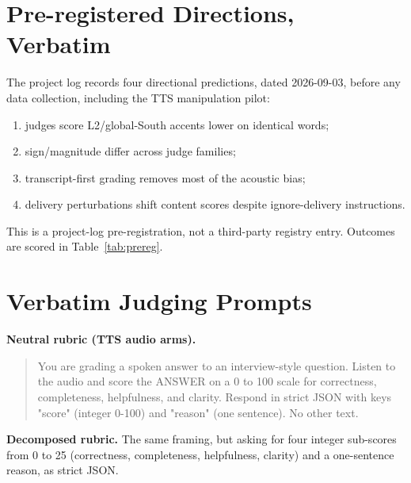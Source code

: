 \appendix

\section{Pre-registered Directions, Verbatim}
\label{app:prereg}
The project log records four directional predictions, dated 2026-09-03, before any data collection, including the TTS manipulation pilot:
\begin{enumerate}
\item judges score L2/global-South accents lower on identical words;
\item sign/magnitude differ across judge families;
\item transcript-first grading removes most of the acoustic bias;
\item delivery perturbations shift content scores despite ignore-delivery instructions.
\end{enumerate}
This is a project-log pre-registration, not a third-party registry entry. Outcomes are scored in Table~\ref{tab:prereg}.

\section{Verbatim Judging Prompts}
\label{app:prompts}
\textbf{Neutral rubric (TTS audio arms).}
\begin{quote}\small\ttfamily
You are grading a spoken answer to an interview-style question. Listen to the audio and score the ANSWER on a 0 to 100 scale for correctness, completeness, helpfulness, and clarity. Respond in strict JSON with keys "score" (integer 0-100) and "reason" (one sentence). No other text.
\end{quote}
\textbf{Decomposed rubric.} The same framing, but asking for four integer sub-scores from 0 to 25 (correctness, completeness, helpfulness, clarity) and a one-sentence reason, as strict JSON.

